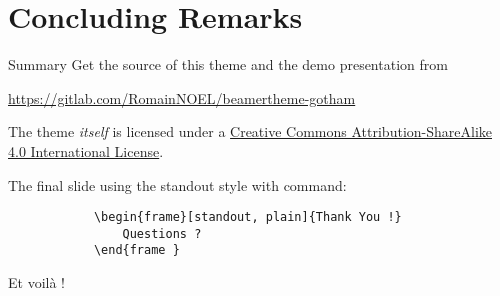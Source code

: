 \documentclass[aspectratio=169]{beamer}
\begin{document}
\section{Concluding Remarks}

	\begin{frame}{Summary}
		Get the source of this theme and the demo presentation from

		\begin{center}\url{https://gitlab.com/RomainNOEL/beamertheme-gotham}\end{center}

		The theme \emph{itself} is licensed under a \href{http://creativecommons.org/licenses/by-sa/4.0/}{Creative Commons Attribution-ShareAlike 4.0 International License}.
		\begin{center} \ccbysa \end{center}
	\end{frame}

   \begin{standoutenv}
   \begin{frame}[fragile]
      The final slide using the standout style with command:
		\begin{verbatim}
			\begin{frame}[standout, plain]{Thank You !}
				Questions ?
		 	\end{frame }
		\end{verbatim}

		\begin{center}
			Et voilà !
		\end{center}
   \end{frame}
   \end{standoutenv}
	
\end{document}
